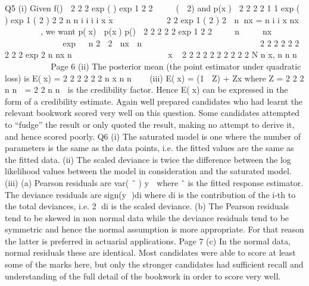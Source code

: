 \documentclass[a4paper,12pt]{article}
\begin{document}
Q5 (i) Given
f(\theta) 
2
2 2
exp ( ) exp 1
2 2
\theta  \mu
  
\sigma \sigma
(  2\mu\theta)
and
p(x\theta) 
2
2
2 2
1 1
exp ( ) exp 1 ( 2 )
2 2
n n
i
i
i i
x x
 
 \theta
   \theta  \theta
\tau \tau  
 2
2
exp 1 ( 2 )
2
 n\theta  nx\theta
{}
=
  n
i
i
x nx

 
 
 
 ,
we want
p(\thetax)  p(x\theta) p(\theta)
 2
2 2 2 2
exp 1
2 2
   n  \theta   \mu  nx  \theta         \sigma \tau   \sigma \tau  
 exp    n
2   2 \mu{}  nx
  n

 

 
\theta
 

 








2 2 2 2 2
2 2 2 2 exp
2
n nx
n
 \tau  \sigma  \mu\tau  \sigma    \theta   
 \sigma \tau  \tau  \sigma  
 \thetax ~
  2 2 2 2
2 2 2 2 2 2 N n x,
n n n
 \tau \sigma \sigma \tau 
 \mu  
 \tau  \sigma \tau  \sigma \tau  \sigma 
Page 6
(ii) The posterior mean (the point estimator under quadratic loss) is
E(\thetax) =
  2 2
2 2 2 2
n x
n n
\tau \sigma
\mu 
\tau  \sigma \tau  \sigma
(iii) E(\thetax) = (1  Z) \mu + Zx
where
Z =
  2
2 2
n
n
\sigma
\tau  \sigma
= 2
2
n
n \tau

\sigma
is the credibility factor. Hence E(\thetax) can be expressed in the form of a
credibility estimate.
Again well prepared candidates who had learnt the relevant bookwork scored
very well on this question. Some candidates attempted to “fudge” the result or
only quoted the result, making no attempt to derive it, and hence scored
poorly.
Q6 (i) The saturated model is one where the number of parameters is the same as the
data points,
i.e. the fitted values are the same as the fitted data.
(ii) The scaled deviance is twice the difference between the log likelihood values
between the model in consideration and the saturated model.
(iii) (a) Pearson residuals are
var( ˆ )
y 
\mu
where ˆ \mu is the fitted response
estimator.
The deviance residuals are sign(y )di where di is the contribution of
the i-th to the total deviances,
i.e. 2
di is the scaled deviance.
(b) The Pearson residuals tend to be skewed in non normal data
while the deviance residuals tend to be symmetric and hence the
normal assumption is more appropriate.
For that reason the latter is preferred in actuarial applications.
Page 7
(c) In the normal data, normal residuals these are identical.
Most candidates were able to score at least some of the marks here, but only
the stronger candidates had sufficient recall and understanding of the full
detail of the bookwork in order to score very well.
\end{document}
